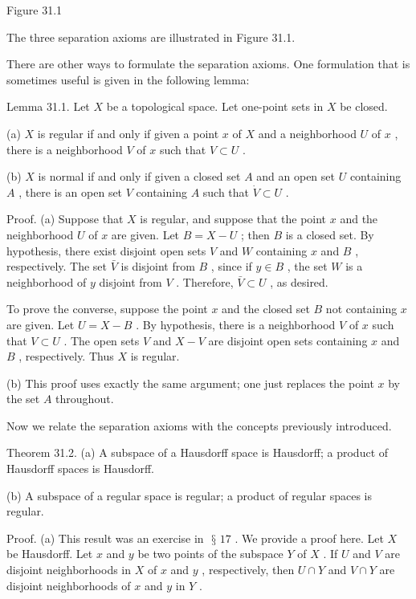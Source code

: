 \documentclass[10pt]{article}
\begin{document}
Figure 31.1

The three separation axioms are illustrated in Figure 31.1.

There are other ways to formulate the separation axioms. One formulation that is sometimes useful is given in the following lemma:

Lemma 31.1. Let \(X\) be a topological space. Let one-point sets in \(X\) be closed.

(a) \(X\) is regular if and only if given a point \(x\) of \(X\) and a neighborhood \(U\) of \(x\) , there is a neighborhood \(V\) of \(x\) such that \(V \subset  U\) .

(b) \(X\) is normal if and only if given a closed set \(A\) and an open set \(U\) containing \(A\) , there is an open set \(V\) containing \(A\) such that \(\dot{V} \subset  U\) .

Proof. (a) Suppose that \(X\) is regular, and suppose that the point \(x\) and the neighborhood \(U\) of \(x\) are given. Let \(B = X - U\) ; then \(B\) is a closed set. By hypothesis, there exist disjoint open sets \(V\) and \(W\) containing \(x\) and \(B\) , respectively. The set \(\bar{V}\) is disjoint from \(B\) , since if \(y \in  B\) , the set \(W\) is a neighborhood of \(y\) disjoint from \(V\) . Therefore, \(\bar{V} \subset  U\) , as desired.

To prove the converse, suppose the point \(x\) and the closed set \(B\) not containing \(x\) are given. Let \(U = X - B\) . By hypothesis, there is a neighborhood \(V\) of \(x\) such that \(V \subset  U\) . The open sets \(V\) and \(X - V\) are disjoint open sets containing \(x\) and \(B\) , respectively. Thus \(X\) is regular.

(b) This proof uses exactly the same argument; one just replaces the point \(x\) by the set \(A\) throughout.

Now we relate the separation axioms with the concepts previously introduced.

Theorem 31.2. (a) A subspace of a Hausdorff space is Hausdorff; a product of Hausdorff spaces is Hausdorff.

(b) A subspace of a regular space is regular; a product of regular spaces is regular.

Proof. (a) This result was an exercise in \(\text{ § }{17}\) . We provide a proof here. Let \(X\) be Hausdorff. Let \(x\) and \(y\) be two points of the subspace \(Y\) of \(X\) . If \(U\) and \(V\) are disjoint neighborhoods in \(X\) of \(x\) and \(y\) , respectively, then \(U \cap  Y\) and \(V \cap  Y\) are disjoint neighborhoods of \(x\) and \(y\) in \(Y\) .
\end{document}
